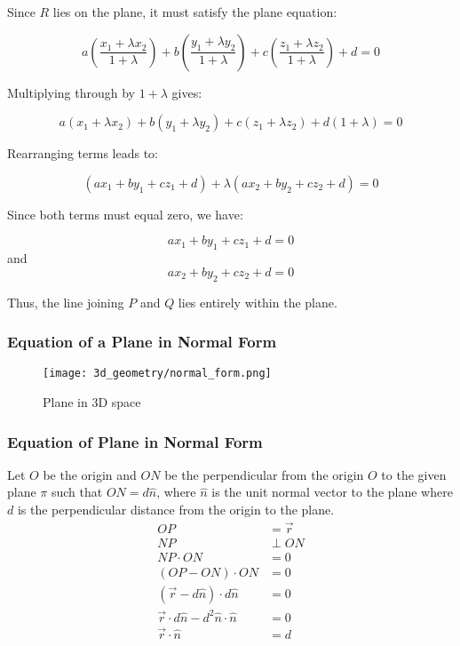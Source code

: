 \begin{frame}
   Since \(R\) lies on the plane, it must satisfy the plane equation:

   \[
   a\left(\frac{x_{1} + \lambda x_{2}}{1+\lambda}\right) + b\left(\frac{y_{1} + \lambda y_{2}}{1+\lambda}\right) + c\left(\frac{z_{1} + \lambda z_{2}}{1+\lambda}\right) + d = 0
   \]

   Multiplying through by \(1+\lambda\) gives:

   \[
   a(x_{1} + \lambda x_{2}) + b(y_{1} + \lambda y_{2}) + c(z_{1} + \lambda z_{2}) + d(1+\lambda) = 0
   \]
\end{frame} 

\begin{frame}
   Rearranging terms leads to:

   \[
   (ax_{1} + by_{1} + cz_{1} + d) + \lambda (ax_{2} + by_{2} + cz_{2} + d) = 0
   \]

   Since both terms must equal zero, we have:

   \[
   ax_{1} + by_{1} + cz_{1} + d = 0
   \]
   and
   \[
   ax_{2} + by_{2} + cz_{2} + d = 0
   \]

   Thus, the line joining \(P\) and \(Q\) lies entirely within the plane.

\end{frame}

\begin{frame}
    \frametitle{Equation of a Plane in Normal Form}
    \begin{figure}
        \texttt{[image: 3d\_geometry/normal\_form.png]}
        \caption{Plane in 3D space}
    \end{figure}
\end{frame}

\begin{frame}
\frametitle{Equation of Plane in Normal Form}
    Let \(O\) be the origin and \(ON\) be the perpendicular from the origin \(O\) to the given plane \(\pi\) such that \(ON = d \hat{n}\), where \(\hat{n}\) is the unit normal vector to the plane where \( d\) is the perpendicular distance from the origin to the plane. 
    \begin{align*} 
        OP &= \vec{r} \\ 
        NP &\perp ON \\ 
        NP \cdot ON &= 0 \\ 
        (OP - ON) \cdot ON &= 0 \\
        ( \vec{r} - d \hat{n}) \cdot d\hat{n} &= 0 \\
        \vec{r} \cdot d \hat{n} - d^2 \hat{n} \cdot \hat{n} &= 0 \\
        \vec{r} \cdot \hat{n} &= d
    \end{align*}
\end{frame}

